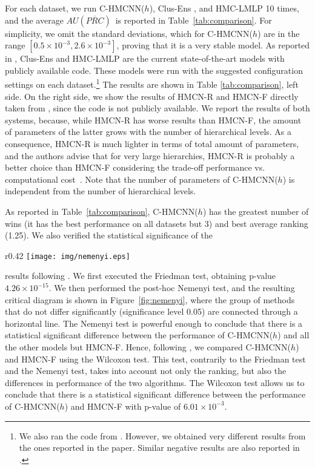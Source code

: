 \documentclass{article}
\newcommand{\system}[1]{C-HMCNN(#1)}
\newcommand{\lmlp}{{HMC-LMLP}}
\newcommand{\ens}{{Clus-Ens}}
\newcommand{\hmcnf}{{HMCN-F}}
\newcommand{\hmcnr}{{HMCN-R}}
\newcommand{\auprc}{$AU(\overline{PRC}) $}
\begin{document}
For each dataset, we run \system{$h$}, {\ens} \citep{schietgat2010}, and {\lmlp} \citep{cerri2016} 10 times, and the average \auprc~is reported in Table~\ref{tab:comparison}. For simplicity, we omit the standard deviations, which for \system{$h$} are in the range $[0.5 \times 10^{-3}, 2.6 \times 10^{-3}]$,  proving that it is  a very stable model. As reported in \citep{nakano2019}, {\ens} and {\lmlp} are the current state-of-the-art models with publicly available code. These models were run with the suggested configuration settings on each dataset.\footnote{We also ran the code from \citep{masera2018}. However, we obtained very different results from the ones reported in the paper. 
Similar negative results are also reported in \citep{nakano2019}.}
The results are shown in Table \ref{tab:comparison}, left side. On the right side, we show the results of {\hmcnr} and {\hmcnf} directly taken from \citep{cerri2018}, since the code is not publicly available. We report the results of both systems, because, while {\hmcnr} has worse results than {\hmcnf}, the amount of parameters of the latter grows with the number of hierarchical levels. As a consequence,   {\hmcnr} is much lighter in terms of total amount of parameters, and the authors advise that for very large hierarchies, {\hmcnr} is probably a better choice than {\hmcnf} considering the trade-off performance vs. computational cost~\cite{cerri2018}. Note that the number of parameters of \system{$h$} is independent from the number of hierarchical levels.

  As reported in Table~\ref{tab:comparison}, \system{$h$} has the greatest number of wins (it has the best performance on all datasets but 3) and best average ranking (1.25). We also verified the statistical significance of the
  \begin{wrapfigure}{r}{0.42\textwidth}
    \centering
    \vspace{-.12cm}
    \texttt{[image: img/nemenyi.eps]}
    \caption{Critical diagram for the Nemenyi's statistical test.\label{fig:nemenyi}}
    \vspace{-.2cm}
\end{wrapfigure}
   results following \cite{demsar2006}. We first executed the Friedman test, obtaining p-value $4.26 \times 10^{-15}$.
  We then performed the post-hoc Nemenyi
   test, and the resulting critical diagram is shown in Figure~\ref{fig:nemenyi}, where the group of methods that do not differ significantly (significance level 0.05) are connected through a horizontal line. The Nemenyi test is powerful enough to conclude that there is a statistical significant difference between the performance of \system{$h$} and all the other models but \hmcnf. Hence, following \citep{demsar2006,benavoli2016}, we compared \system{$h$} and {\hmcnf} using the Wilcoxon test. This test, contrarily to the Friedman test and the Nemenyi test, takes into account not only the ranking, but also the differences in performance of the two algorithms.  
 The Wilcoxon test allows us to conclude that there is a statistical significant difference between the  performance of \system{$h$} and {\hmcnf} with p-value of $6.01 \times 10^{-3}$. 
\end{document}
